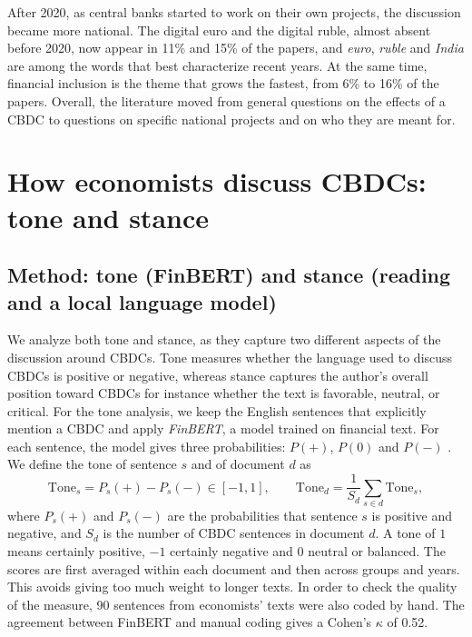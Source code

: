 \documentclass[11pt,a4paper]{article}
\begin{document}



After 2020, as central banks started to work on their own projects, the discussion became more national. 
The digital euro and the digital ruble, almost absent before 2020, now appear in 11\% and 15\% of the 
papers, and \emph{euro}, \emph{ruble} and \emph{India} are among the words that best characterize recent 
years. At the same time, financial inclusion is the theme that grows the fastest, from 6\% to 16\% of the 
papers. Overall, the literature moved from general questions on the effects of a CBDC to questions on 
specific national projects and on who they are meant for.





\section{How economists discuss CBDCs: tone and stance}\label{sec:how}
\subsection{Method: tone (FinBERT) and stance (reading and a local language model)}
We analyze both tone and stance, as they capture two different aspects of the discussion around CBDCs. 
Tone measures whether the language used to discuss CBDCs is positive or negative, whereas stance captures 
the author’s overall position toward CBDCs for instance whether the text is favorable, neutral, or critical.
For the tone analysis, we keep the English sentences that explicitly mention a CBDC and apply \textit{FinBERT}, 
a model trained on financial text. For each sentence, the model gives three probabilities: \(P(+)\), \(P(0)\) and \(P(-)\) . 
We define the tone of sentence $s$ and of document $d$ as
\begin{equation}\label{eq:tone}
\text{Tone}_s = P_s(+) - P_s(-) \in [-1, 1],
\qquad
\text{Tone}_d = \frac{1}{S_d}\sum_{s \in d} \text{Tone}_s ,
\end{equation}
where $P_s(+)$ and $P_s(-)$ are the probabilities that sentence $s$ is positive and negative, and $S_d$ is the number of 
CBDC sentences in document $d$. A tone of $1$ means certainly positive, $-1$ certainly negative and $0$ neutral or balanced.
The scores are first averaged within each document and then across groups and years. This avoids giving too much 
weight to longer texts. In order to check the quality of the measure, 90 sentences from economists’ texts were also 
coded by hand. The agreement between FinBERT and manual coding gives a Cohen’s \(\kappa\) of 0.52.
\end{document}
